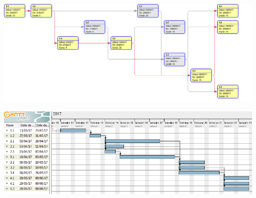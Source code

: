 \documentclass[a4paper, 12pt]{article}
\begin{document}
\clearpage
{}
\begin{center}
\includegraphics[angle=90, height=0.9\textheight]{img/pert.png}
\end{center}

\clearpage
{}
\begin{center}
\includegraphics[angle=90, height=0.9\textheight]{img/gantt.png}
\end{center}
\end{document}
